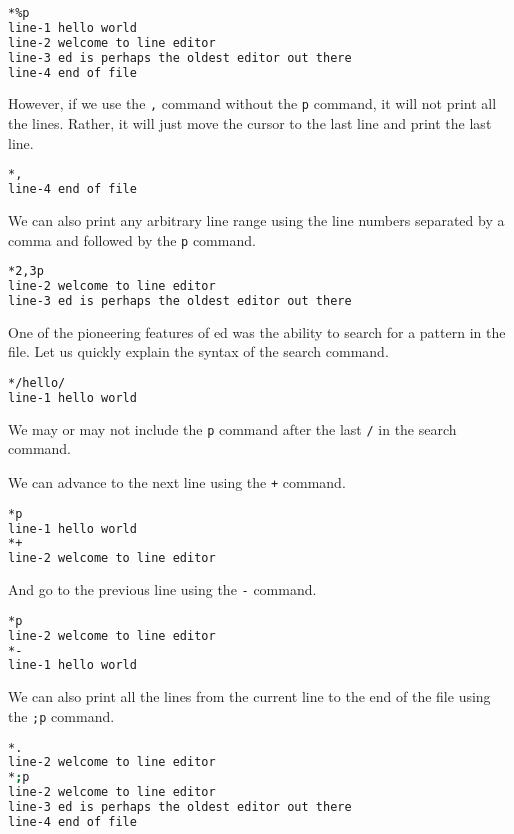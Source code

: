 \begin{lstlisting}[language=bash]
*%p
line-1 hello world
line-2 welcome to line editor
line-3 ed is perhaps the oldest editor out there
line-4 end of file
\end{lstlisting}

However, if we use the \lstinline|,| command without
the \lstinline|p| command, it will not print all the lines.
Rather, it will just move the cursor to the last line
and print the last line.

\begin{lstlisting}[language=bash]
*,
line-4 end of file
\end{lstlisting}

We can also print any arbitrary line range
using the line numbers separated by a comma
and followed by the \lstinline|p| command.

\begin{lstlisting}[language=bash]
*2,3p
line-2 welcome to line editor
line-3 ed is perhaps the oldest editor out there
\end{lstlisting}

One of the pioneering features of ed was the ability
to search for a pattern in the file. Let us quickly
explain the syntax of the search command.

\begin{lstlisting}[language=bash]
*/hello/
line-1 hello world
\end{lstlisting}

We may or may not include the \lstinline|p| command
after the last \lstinline|/| in the search command.

We can advance to the next line using the \lstinline|+| command.

\begin{lstlisting}[language=bash]
*p
line-1 hello world
*+
line-2 welcome to line editor
\end{lstlisting}

And go to the previous line using the \lstinline|-| command.


\begin{lstlisting}[language=bash]
*p
line-2 welcome to line editor
*-
line-1 hello world
\end{lstlisting}

We can also print all the lines from the current line
to the end of the file using the \lstinline|;p| command.

\begin{lstlisting}[language=bash]
*.
line-2 welcome to line editor
*;p
line-2 welcome to line editor
line-3 ed is perhaps the oldest editor out there
line-4 end of file
\end{lstlisting}

